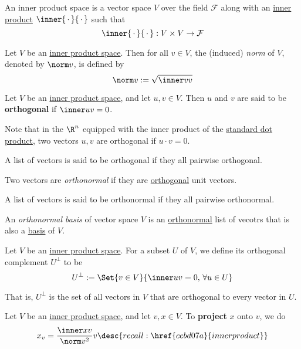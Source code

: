 \label{b9935c8}

An inner product space is a vector space $V$ over the field $\mathcal F$ along
with an \href{cebd07a}{inner product} $\inner{\,\cdot\,}{\,\cdot\,}$ such that
$$
  \inner{\,\cdot\,}{\,\cdot\,}:V\times V\to\mathcal F
$$

\label{d828dac}

Let $V$ be an \href{b9935c8}{inner product space}. Then for all $v\in V$, the
(induced) \textit{norm} of $V$, denoted by $\norm v$, is defined by
$$
  \norm v:=\sqrt{\inner vv}
$$

\label{d9735e5}

Let $V$ be an \href{b9935c8}{inner product space}, and let $u,v\in V$. Then $u$
and $v$ are said to be \textbf{orthogonal} if $\inner uv=0$.

Note that in the $\R^n$ equipped with the inner product of the
\href{ba82373}{standard dot product}, two vectors $u,v$ are orthogonal if
$u\cdot v=0$.

A list of vectors is said to be orthogonal if they all pairwise orthogonal.

\label{d90fcb1}

Two vectors are \textit{orthonormal} if they are \href{d9735e5}{orthogonal}
unit vectors.

A list of vectors is said to be orthonormal if they all pairwise orthonormal.

\label{e112aa0}

An \textit{orthonormal basis} of vector space $V$ is an
\href{d90fcb1}{orthonormal} list of vecotrs that is also a
\href{db2477b}{basis} of $V$.

\label{c3c519f}

Let $V$ be an \href{b9935c8}{inner product space}. For a subset $U$ of $V$, we
define its orthogonal complement $U^\perp$ to be
$$
  U^\perp:=\Set{v\in V}{\inner uv=0,\,\forall u\in U}
$$

That is, $U^\perp$ is the set of all vectors in $V$ that are orthogonal to
every vector in $U$.

\label{fc332ef}

Let $V$ be an \href{b9935c8}{inner product space}, and let $v,x\in V$. To
\textbf{project} $x$ onto $v$, we do
$$
  x_v=\frac{\inner xv}{\norm v^2}v\desc{recall: \href{cebd07a}{inner product}}
$$

